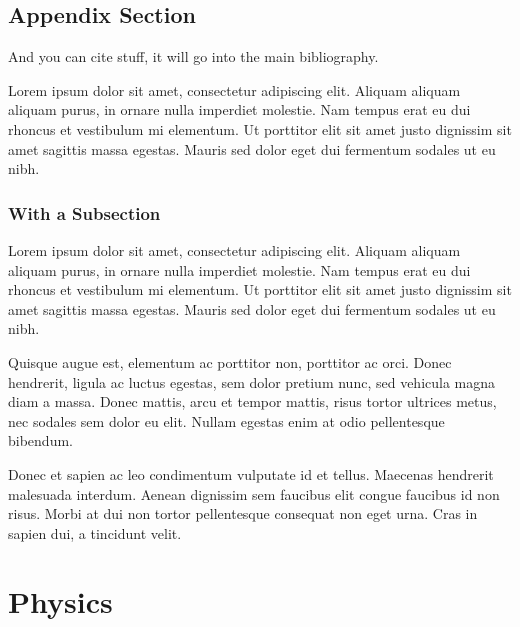 \documentclass[11pt,a4paper,oneside,article]{memoir}
\begin{document}
\section{Appendix Section}

And you can cite \cite{tobias:book} stuff, it will go into the main bibliography.

Lorem ipsum dolor sit amet, consectetur adipiscing elit. Aliquam aliquam aliquam purus, in ornare nulla imperdiet molestie. Nam tempus erat eu dui rhoncus et vestibulum mi elementum. Ut porttitor elit sit amet justo dignissim sit amet sagittis massa egestas. Mauris sed dolor eget dui fermentum sodales ut eu nibh.

\subsection{With a Subsection}

Lorem ipsum dolor sit amet, consectetur adipiscing elit. Aliquam aliquam aliquam purus, in ornare nulla imperdiet molestie. Nam tempus erat eu dui rhoncus et vestibulum mi elementum. Ut porttitor elit sit amet justo dignissim sit amet sagittis massa egestas. Mauris sed dolor eget dui fermentum sodales ut eu nibh.

Quisque augue est, elementum ac porttitor non, porttitor ac orci. Donec hendrerit, ligula ac luctus egestas, sem dolor pretium nunc, sed vehicula magna diam a massa. Donec mattis, arcu et tempor mattis, risus tortor ultrices metus, nec sodales sem dolor eu elit. Nullam egestas enim at odio pellentesque bibendum. 

Donec et sapien ac leo condimentum vulputate id et tellus. Maecenas hendrerit malesuada interdum. Aenean dignissim sem faucibus elit congue faucibus id non risus. Morbi at dui non tortor pellentesque consequat non eget urna. Cras in sapien dui, a tincidunt velit.

\clearpage %
\setcounter{page}{1} %

\chapter{Physics}\label{appx:second}
\end{document}
